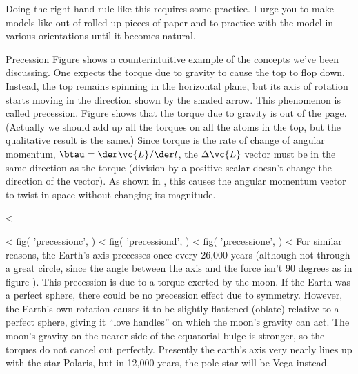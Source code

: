 Doing the right-hand rule like this requires some practice.
I urge you to make models like  out of rolled
up pieces of paper and to practice with the model in various
orientations until it becomes natural.

\begin{eg}{Precession}\label{eg:precession}
Figure  shows a counterintuitive
example of the concepts we've been discussing. One expects
the torque due to gravity to cause the top to flop down.
Instead, the top remains spinning in the horizontal plane,
but its axis of rotation starts moving in the direction
shown by the shaded arrow. This phenomenon is called
precession.
Figure  shows that the torque due to
gravity is out of the page. (Actually we should add up all
the torques on all the atoms in the top, but the qualitative
result is the same.)
Since torque is the rate of change
of angular momentum, $\btau=\der\vc{L}/\der t$, 
the $\Delta\vc{L}$ vector must be in
the same direction as the torque (division by a positive
scalar doesn't change the direction of the vector). As shown
in , this causes the angular momentum vector to
twist in space without changing its magnitude.
\end{eg}

<%

<%
  fig(
    'precessionc',
  )
\spacebetweenfigs
<%
  fig(
    'precessiond',
  )
\spacebetweenfigs
<%
  fig(
    'precessione',
  )
<%
For similar reasons, the Earth's axis precesses once every
26,000 years (although not through a great circle, since the
angle between the axis and the force isn't 90 degrees as
in figure ). This precession is due to a
torque exerted by the moon. If the Earth was a perfect
sphere, there could be no precession effect due to symmetry.
However, the Earth's own rotation causes it to be slightly
flattened (oblate) relative to a perfect sphere, giving it
``love handles'' on which the moon's gravity can act. The
moon's gravity on the nearer side of the equatorial bulge 
is stronger, so the torques do not cancel out perfectly. 
Presently the earth's axis very nearly lines up with the
star Polaris, but in 12,000 years, the pole star will be Vega
instead.

